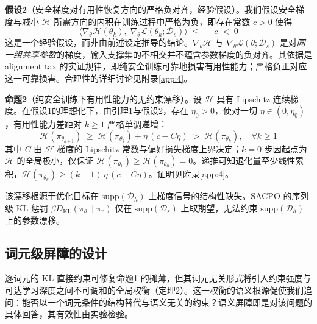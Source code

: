 \documentclass[lettersize,journal]{IEEEtran}
\begin{document}
\textbf{假设2}\label{jiashe2}（安全梯度对有用性恢复方向的严格负对齐，经验假设）。我们假设安全梯度与减小 $\mathcal{H}$ 所需方向的内积在训练过程中严格为负，即存在常数 $c > 0$ 使得
\begin{equation}\label{eq:assumption2}
    \big\langle \nabla_\theta \mathcal{H}(\theta_k),\; 
    \nabla_\theta \mathcal{L}(\theta_k; \mathcal{D}_s) 
    \big\rangle \;\leq\; -c \;<\; 0
\end{equation}
这是一个经验假设，而非由前述设定推导的结论。$\nabla_\theta\mathcal{H}$ 与 $\nabla_\theta\mathcal{L}(\theta;\mathcal{D}_s)$ 是对\textit{同一组共享参数}的梯度，输入支撑集的不相交并不蕴含参数梯度的负对齐。其依据是 alignment tax 的实证规律，即纯安全训练可靠地损害有用性能力\cite{yu2020gradient, kirkpatrick2017overcoming}；严格负正对应这一可靠损害。合理性的详细讨论见附录\ref{app:4}。

\textbf{命题2}（纯安全训练下有用性能力的无约束漂移）。设 $\mathcal{H}$ 具有 Lipschitz 连续梯度。在假设1的理想化下，由引理1与假设2，存在 $\eta_0 > 0$，使对一切 $\eta \in (0, \eta_0)$，有用性能力差距对 $k \geq 1$ 严格单调递增：
\begin{equation}\label{dandiaobujian}
    \mathcal{H}(\pi_{\theta_{k+1}}) \;\geq\; \mathcal{H}(\pi_{\theta_k}) 
    + \eta\,(c - C\eta) \;>\; \mathcal{H}(\pi_{\theta_k}), 
    \quad \forall k \geq 1
\end{equation}
其中 $C$ 由 $\mathcal{H}$ 梯度的 Lipschitz 常数与偏好损失梯度上界决定；$k = 0$ 步因起点为 $\mathcal{H}$ 的全局极小，仅保证 $\mathcal{H}(\pi_{\theta_1}) \geq \mathcal{H}(\pi_{\theta_0}) = 0$。递推可知退化量至少线性累积，$\mathcal{H}(\pi_{\theta_k}) \geq (k-1)\,\eta\,(c - C\eta)$。证明见附录\ref{app:4}。

该漂移根源于优化目标在 $\mathrm{supp}(\mathcal{D}_h)$ 上梯度信号的结构性缺失。SACPO 的序列级 KL 惩罚 $\beta D_{\mathrm{KL}}(\pi_\theta \| \pi_r)$ 仅在 $\mathrm{supp}(\mathcal{D}_s)$ 上取期望，无法约束 $\mathrm{supp}(\mathcal{D}_h)$ 上的参数漂移。

\subsection{词元级屏障的设计}\label{token barrier}
逐词元的 KL 直接约束可修复命题1 的摊薄，但其词元无关形式将引入约束强度与可达学习深度之间不可调和的全局权衡（定理2）。这一权衡的语义根源促使我们追问：能否以一个词元条件的结构替代与语义无关的约束？语义屏障即是对该问题的具体回答，其有效性由实验检验。
\end{document}

